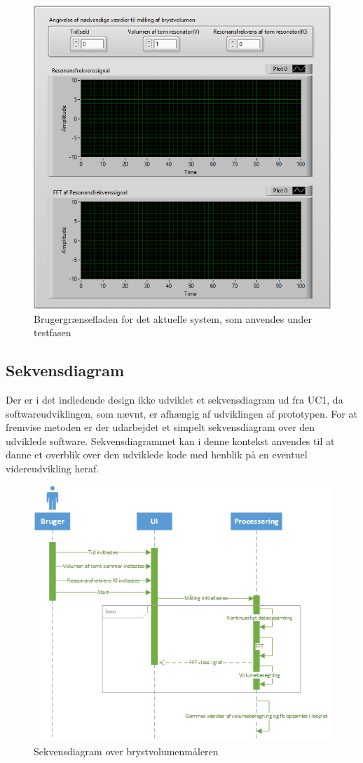\begin{figure}[htb]
\centering
\includegraphics[width=5in]{Frontpanel.PNG}
\caption{Brugergrænsefladen for det aktuelle system, som anvendes under testfasen}
\label{fig:ui}
\end{figure}

\subsection{Sekvensdiagram}
Der er i det indledende design ikke udviklet et sekvensdiagram ud fra UC1, da softwareudviklingen, som nævnt, er afhængig af udviklingen af prototypen. For at fremvise metoden er der udarbejdet et simpelt sekvensdiagram over den udviklede software. Sekvensdiagrammet kan i denne kontekst anvendes til at danne et overblik over den udviklede kode med henblik på en eventuel videreudvikling heraf. 

\begin{figure}[htb]
\centering
\includegraphics[width=6in]{sekvensdiagram.png}
\caption{Sekvensdiagram over brystvolumenmåleren}
\label{fig:sekvens}
\end{figure}



